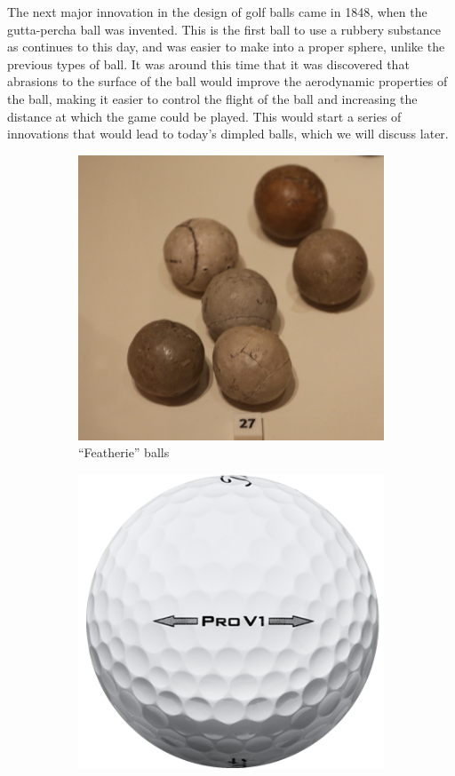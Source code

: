 The next major innovation in the design of golf balls came in 1848, when the gutta-percha
ball was invented. This is the first ball to use a rubbery substance as continues to this day,
and was easier to make into a proper sphere, unlike the previous types of ball. It was around
this time that it was discovered that abrasions to the surface of the ball would improve the
aerodynamic properties of the ball, making it easier to control the flight of the ball and increasing
the distance at which the game could be played. This would start a series of innovations that
would lead to today’s dimpled balls, which we will discuss later.

\vspace{\baselineskip}

\begin{figure}[h]
\centering
\begin{subfigure}[b]{0.4\textwidth}
\includegraphics[scale=0.16]{../images/featherie.jpg}
\caption{``Featherie'' balls}
\label{im:featherie}
\end{subfigure}
\quad \quad \quad \quad
\begin{subfigure}[b]{0.4\textwidth}
\includegraphics[scale=0.5]{../images/pv1.png}

\end{subfigure}
\end{figure}
